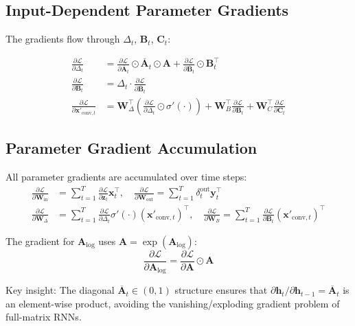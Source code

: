 \documentclass[11pt,a4paper]{article}
\newcommand{\loss}{\mathcal{L}}
\begin{document}
\subsection{Input-Dependent Parameter Gradients}

The gradients flow through $\Delta_t$, $\mathbf{B}_t$, $\mathbf{C}_t$:

\begin{align}
  \frac{\partial\loss}{\partial \Delta_t} &= \frac{\partial\loss}{\partial \overline{\mathbf{A}}_t} \odot \overline{\mathbf{A}}_t \odot \mathbf{A}
    + \frac{\partial\loss}{\partial \overline{\mathbf{B}}_t} \odot \mathbf{B}_t^\top \\
  \frac{\partial\loss}{\partial \mathbf{B}_t} &= \Delta_t \cdot \frac{\partial\loss}{\partial \overline{\mathbf{B}}_t} \\
  \frac{\partial\loss}{\partial \mathbf{x}'_{\text{conv},t}} &= \mathbf{W}_\Delta^\top \left( \frac{\partial\loss}{\partial \Delta_t} \odot \sigma'(\cdot) \right)
    + \mathbf{W}_B^\top \frac{\partial\loss}{\partial \mathbf{B}_t} + \mathbf{W}_C^\top \frac{\partial\loss}{\partial \mathbf{C}_t}
\end{align}

\subsection{Parameter Gradient Accumulation}

All parameter gradients are accumulated over time steps:
\begin{align}
  \frac{\partial\loss}{\partial \mathbf{W}_{\text{in}}} &= \sum_{t=1}^T \frac{\partial\loss}{\partial \mathbf{z}_t} \mathbf{x}_t^\top, \quad
  \frac{\partial\loss}{\partial \mathbf{W}_{\text{out}}} = \sum_{t=1}^T \delta_t^{\text{out}} \mathbf{y}_t^\top \\
  \frac{\partial\loss}{\partial \mathbf{W}_\Delta} &= \sum_{t=1}^T \frac{\partial\loss}{\partial \Delta_t} \sigma'(\cdot) (\mathbf{x}'_{\text{conv},t})^\top, \quad
  \frac{\partial\loss}{\partial \mathbf{W}_B} = \sum_{t=1}^T \frac{\partial\loss}{\partial \mathbf{B}_t} (\mathbf{x}'_{\text{conv},t})^\top
\end{align}

The gradient for $\mathbf{A}_{\log}$ uses $\mathbf{A} = \exp(\mathbf{A}_{\log})$:
\[
\frac{\partial\loss}{\partial \mathbf{A}_{\log}} = \frac{\partial\loss}{\partial \mathbf{A}} \odot \mathbf{A}
\]

Key insight: The diagonal $\overline{\mathbf{A}}_t \in (0, 1)$ structure ensures
that $\partial\mathbf{h}_t / \partial\mathbf{h}_{t-1} = \overline{\mathbf{A}}_t$
is an element-wise product, avoiding the vanishing/exploding gradient problem
of full-matrix RNNs.
\end{document}
